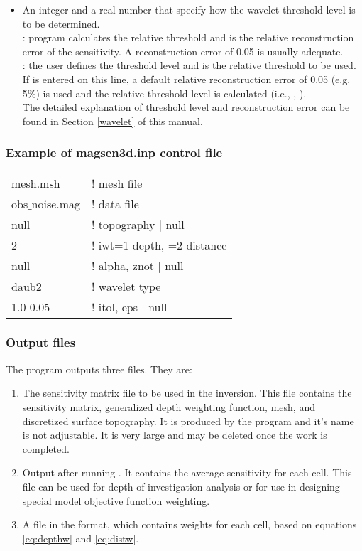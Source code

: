 \begin{itemize}
\item[\fileName{itol,eps}] An integer and a real number that specify how the wavelet threshold level is to be determined.\\
: program calculates the relative threshold and  is the relative reconstruction error of the sensitivity. A reconstruction error of 0.05 is usually adequate.\\
: the user defines the threshold level and  is the relative threshold to be used. If  is entered on this line, a default relative reconstruction error of 0.05 (e.g. 5\%) is used and the relative threshold level is calculated (i.e., , ).\\
The detailed explanation of threshold level and reconstruction error can be found in Section \ref{wavelet} of this manual.
\end{itemize}

\subsubsection*{Example of magsen3d.inp control file}

\begin{fileExample}
\begin{tabular}{|ll|}
\hline
mesh.msh & ! mesh file\\
obs$\_$noise.mag & ! data file\\
null & ! topography | null \\
2 & ! iwt=1 depth, =2 distance\\
null & ! alpha, znot | null\\
daub2 & ! wavelet type \\
1.0 0.05 & ! itol, eps | null\\
\hline
\end{tabular}
\end{fileExample}

\subsubsection{Output files}
The program  outputs three files. They are:
\begin{enumerate}
\item {} The sensitivity matrix file to be used in the inversion. This file contains the sensitivity matrix, generalized depth weighting function, mesh, and discretized surface topography. It is produced by the program and it's name is not adjustable. It is very large and may be deleted once the work is completed.
\item {} Output after running . It contains the average sensitivity for each cell. This file can be used for depth of investigation analysis or for use in designing special model objective function weighting.
\item {} A file in the  format, which contains weights for each cell, based on equations \ref{eq:depthw} and \ref{eq:distw}.
\end{enumerate}

